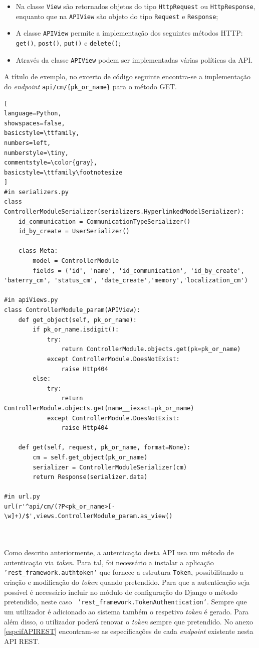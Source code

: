 \begin{itemize}
	\item Na classe \texttt{View} são retornados objetos do tipo \texttt{HttpRequest} ou \texttt{HttpResponse}, enquanto que na \texttt{APIView} são objeto do tipo \texttt{Request} e \texttt{Response}; 
	\item A classe \texttt{APIView} permite a implementação dos seguintes métodos \ac{HTTP}: 	\texttt{get()}, \texttt{post()}, \texttt{put()} e \texttt{delete()}; 
	\item Através da classe  \texttt{APIView} podem ser implementadas várias políticas da \ac{API}. 
\end{itemize}

A título de exemplo, no excerto de código seguinte encontra-se a implementação do \textit{endpoint} \texttt{api/cm/\{pk\_or\_name\}} para o método GET. 

\begin{lstlisting}[
language=Python,
showspaces=false,
basicstyle=\ttfamily,
numbers=left,
numberstyle=\tiny,
commentstyle=\color{gray},
basicstyle=\ttfamily\footnotesize
]
#in serializers.py
class ControllerModuleSerializer(serializers.HyperlinkedModelSerializer):
	id_communication = CommunicationTypeSerializer()
	id_by_create = UserSerializer()

	class Meta:
		model = ControllerModule
		fields = ('id', 'name', 'id_communication', 'id_by_create', 'baterry_cm', 'status_cm', 'date_create','memory','localization_cm')

#in apiViews.py 
class ControllerModule_param(APIView):
	def get_object(self, pk_or_name):
		if pk_or_name.isdigit():
			try:
				return ControllerModule.objects.get(pk=pk_or_name)
			except ControllerModule.DoesNotExist:
				raise Http404
		else:
			try:
				return ControllerModule.objects.get(name__iexact=pk_or_name)
			except ControllerModule.DoesNotExist:
				raise Http404
	
	def get(self, request, pk_or_name, format=None):
		cm = self.get_object(pk_or_name)
		serializer = ControllerModuleSerializer(cm)
		return Response(serializer.data)

#in url.py
url(r'^api/cm/(?P<pk_or_name>[-\w]+)/$',views.ControllerModule_param.as_view()



\end{lstlisting}

Como descrito anteriormente, a autenticação desta API usa um método de autenticação via \textit{token}. Para tal, foi necessário a instalar a aplicação \texttt{'rest\_framework.authtoken'} que fornece a estrutura \texttt{Token}, possibilitando a criação e modificação do \textit{token} quando pretendido. Para que a autenticação seja possível é necessário incluir no módulo de configuração do Django o método pretendido, neste caso  \ \texttt{'rest\_framework.TokenAuthentication'}. Sempre que um utilizador é adicionado ao sistema também o respetivo \textit{token} é gerado. Para além disso, o utilizador poderá renovar o \textit{token} sempre que pretendido. No anexo \ref{espcifAPIREST} encontram-se as especificações de cada \textit{endpoint} existente nesta API REST.

